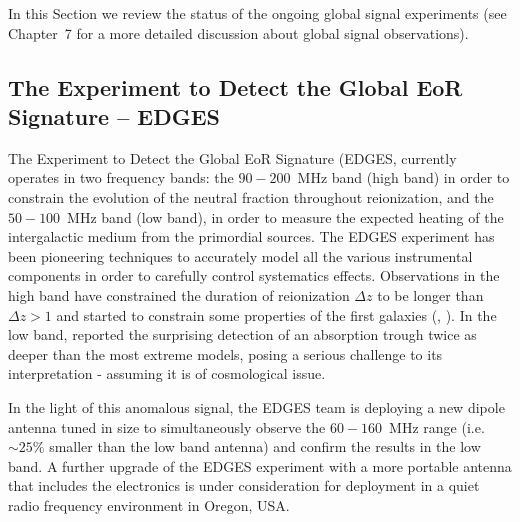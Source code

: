 In this Section we review the status of the ongoing global signal experiments (see Chapter~7 for a more detailed discussion about global signal observations).

\subsection{The Experiment to Detect the Global EoR Signature -- EDGES}
The Experiment to Detect the Global EoR Signature (EDGES, \cite{bowman08} currently operates in two frequency bands: the $90-200$~MHz band (high band) in order to constrain the evolution of the neutral fraction throughout reionization, and the $50-100$~MHz band (low band), in order to measure the expected heating of the intergalactic medium from the primordial sources. 
The EDGES experiment has been pioneering techniques to accurately model all the various instrumental components in order to carefully control systematics effects. Observations in the high band have constrained the duration of reionization $\Delta z$ to be longer than $\Delta z >  1$ and started to constrain some properties of the first galaxies (\cite{monsalve17}, \cite{monsalve18}). In the low band, \cite{bowman18} reported the surprising detection of an absorption trough twice as deeper than the most extreme models, posing a serious challenge to its interpretation - assuming it is of cosmological issue. 

In the light of this anomalous signal, the EDGES team is deploying a new dipole antenna tuned in size to simultaneously observe the $60-160$~MHz range (i.e. $\sim 25\%$ smaller than the low band antenna) and confirm the results in the low band. A further upgrade of the EDGES experiment with a more portable antenna that includes the electronics is under consideration for deployment in a quiet radio frequency environment in Oregon, USA.



